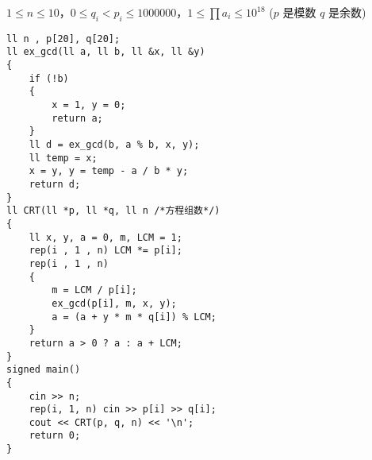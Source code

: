 \documentclass[E:/GsjzTle/main/main.tex]{subfiles}
\begin{document}
\(1 \leq n\le10\)，\(0 \leq q_i < p_i\le1000000\)，\( 1\leq \prod a_i \leq 10^{18}\)
(\(p\) 是模数 \(q\) 是余数)

\begin{lstlisting}
ll n , p[20], q[20];
ll ex_gcd(ll a, ll b, ll &x, ll &y)
{
	if (!b)
	{
		x = 1, y = 0;
		return a;
	}
	ll d = ex_gcd(b, a % b, x, y);
	ll temp = x;
	x = y, y = temp - a / b * y;
	return d;
}
ll CRT(ll *p, ll *q, ll n /*方程组数*/)
{
	ll x, y, a = 0, m, LCM = 1;
	rep(i , 1 , n) LCM *= p[i];
	rep(i , 1 , n)
	{
		m = LCM / p[i];
		ex_gcd(p[i], m, x, y);
		a = (a + y * m * q[i]) % LCM;
	}
	return a > 0 ? a : a + LCM;
}
signed main()
{
	cin >> n;
	rep(i, 1, n) cin >> p[i] >> q[i];
	cout << CRT(p, q, n) << '\n';
	return 0;
}
\end{lstlisting}
\end{document}
